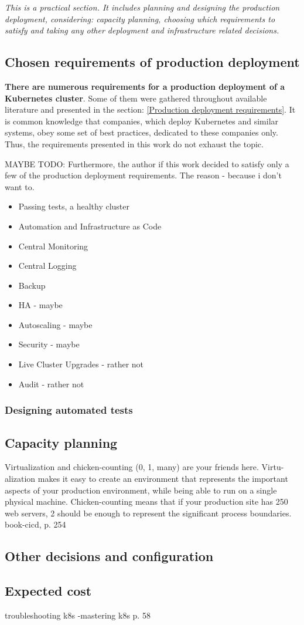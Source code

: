 \textit{This is a practical section. It includes planning and designing the production deployment, considering: capacity planning, choosing which requirements to satisfy and taking any other deployment and infrastructure related decisions.}
~\\

\subsection{Chosen requirements of production deployment}
\textbf{There are numerous requirements for a production deployment of a Kubernetes cluster}. Some of them were gathered throughout available literature and presented in the section: \ref{Production deployment requirements}. It is common knowledge that companies, which deploy Kubernetes and similar systems, obey some set of best practices, dedicated to these companies only. Thus, the requirements presented in this work do not exhaust the topic.

MAYBE TODO:
Furthermore, the author if this work decided to satisfy only a few of the production deployment requirements. The reason - because i don't want to.

\begin{itemize}
\item Passing tests, a healthy cluster
\item Automation and Infrastructure as Code
\item Central Monitoring
\item Central Logging
\item Backup
\item HA - maybe
\item Autoscaling - maybe
\item Security - maybe
\item Live Cluster Upgrades - rather not
\item Audit - rather not
\end{itemize}

\subsubsection{Designing automated tests}

\subsection{Capacity planning}
Virtualization and chicken-counting (0, 1, many) are your friends here. Virtu-
alization makes it easy to create an environment that represents the important
aspects of your production environment, while being able to run on a single
physical machine. Chicken-counting means that if your production site has
250 web servers, 2 should be enough to represent the significant process
boundaries. book-cicd, p. 254

\subsection{Other decisions and configuration}

\subsection{Expected cost}



troubleshooting k8s -mastering k8s p. 58
